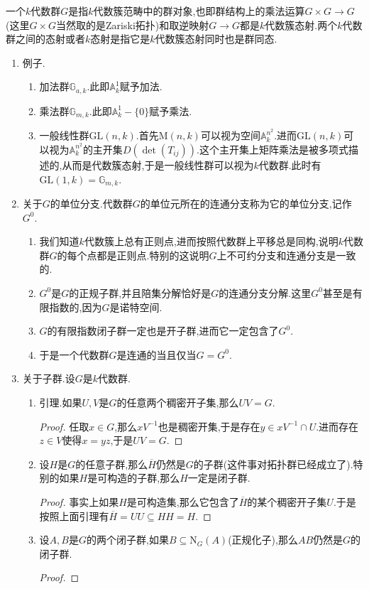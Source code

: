 一个$k$代数群$G$是指$k$代数簇范畴中的群对象,也即群结构上的乘法运算$G\times G\to G$(这里$G\times G$当然取的是Zariski拓扑)和取逆映射$G\to G$都是$k$代数簇态射.两个$k$代数群之间的态射或者$k$态射是指它是$k$代数簇态射同时也是群同态.
\begin{enumerate}
	\item 例子.
	\begin{enumerate}[(1)]
		\item 加法群$\mathbb{G}_{a,k}$.此即$\mathbb{A}^1_k$赋予加法.
		\item 乘法群$\mathbb{G}_{m,k}$.此即$\mathbb{A}^1_k-\{0\}$赋予乘法.
		\item 一般线性群$\mathrm{GL}(n,k)$.首先$\mathrm{M}(n,k)$可以视为空间$\mathbb{A}_k^{n^2}$.进而$\mathrm{GL}(n,k)$可以视为$\mathbb{A}_k^{n^2}$的主开集$D(\det(T_{ij}))$.这个主开集上矩阵乘法是被多项式描述的,从而是代数簇态射,于是一般线性群可以视为$k$代数群.此时有$\mathrm{GL}(1,k)=\mathbb{G}_{m,k}$.
	\end{enumerate}
	\item 关于$G$的单位分支.代数群$G$的单位元所在的连通分支称为它的单位分支,记作$G^0$.
	\begin{enumerate}[(1)]
		\item 我们知道$k$代数簇上总有正则点,进而按照代数群上平移总是同构,说明$k$代数群$G$的每个点都是正则点.特别的这说明$G$上不可约分支和连通分支是一致的.
		\item $G^0$是$G$的正规子群,并且陪集分解恰好是$G$的连通分支分解.这里$G^0$甚至是有限指数的,因为$G$是诺特空间.
		\item $G$的有限指数闭子群一定也是开子群,进而它一定包含了$G^0$.
		\item 于是一个代数群$G$是连通的当且仅当$G=G^0$.
	\end{enumerate}
	\item 关于子群.设$G$是$k$代数群.
	\begin{enumerate}[(1)]
		\item 引理.如果$U,V$是$G$的任意两个稠密开子集,那么$UV=G$.
		\begin{proof}
			
			任取$x\in G$,那么$xV^{-1}$也是稠密开集,于是存在$y\in xV^{-1}\cap U$.进而存在$z\in V$使得$x=yz$,于是$UV=G$.
		\end{proof}
		\item 设$H$是$G$的任意子群,那么$\overline{H}$仍然是$G$的子群(这件事对拓扑群已经成立了).特别的如果$H$是可构造的子群,那么$H$一定是闭子群.
		\begin{proof}
			
			事实上如果$H$是可构造集,那么它包含了$\overline{H}$的某个稠密开子集$U$.于是按照上面引理有$\overline{H}=UU\subseteq HH=H$.
		\end{proof}
		\item 设$A,B$是$G$的两个闭子群,如果$B\subseteq\mathrm{N}_G(A)$(正规化子),那么$AB$仍然是$G$的闭子群.
		\begin{proof}
			

\end{proof}
\end{enumerate}
\end{enumerate}
